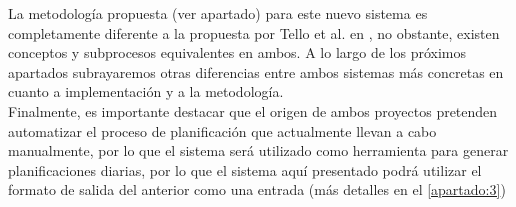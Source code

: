 La metodología propuesta (ver apartado) para este nuevo sistema es completamente diferente a la propuesta por Tello et al. en \cite{articulo1}, no obstante, existen conceptos y subprocesos equivalentes en ambos. 
A lo largo de los próximos apartados subrayaremos otras diferencias entre ambos sistemas más concretas en cuanto a implementación y a la metodología.
\\

Finalmente, es importante destacar que el origen de ambos proyectos pretenden automatizar el proceso de planificación que actualmente llevan a cabo manualmente, por lo que el sistema \legacy{} será utilizado como herramienta para generar planificaciones diarias, por lo que el sistema aquí presentado podrá utilizar el formato de salida del anterior como una entrada (más detalles en el \autoref{apartado:3}) 



